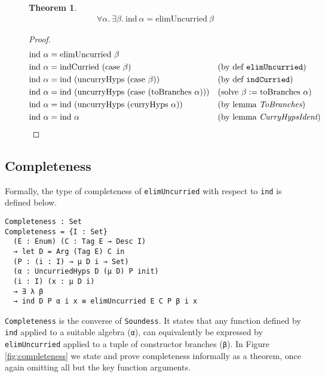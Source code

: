 \documentclass[nonatbib]{sigplanconf}
\newtheorem*{mythm}{Theorem}
\newcommand{\reffig}[1]{Figure \ref{fig:#1}}
\begin{document}
\begin{figure*}
\caption{Completeness of {\tt elim}}
\label{fig:completeness}
\begin{mythm}
\begin{align*}
\forall \alpha. ~ \exists \beta.
~ \textrm{ind} ~ \alpha = \textrm{elimUncurried} ~ \beta
\end{align*}
\end{mythm}

\begin{proof}
\begin{align*}
\textrm{ind} ~ \alpha &= \textrm{elimUncurried} ~ \beta& && \\
\textrm{ind} ~ \alpha &=\textrm{indCurried} ~ ( \textrm{case} ~ \beta ) && \text{(by def {\tt elimUncurried})} \notag\\
\textrm{ind} ~ \alpha &= \textrm{ind} ~ ( \textrm{uncurryHyps} ~ ( \textrm{case} ~ \beta ) ) && \text{(by def {\tt indCurried})} \notag\\
\textrm{ind} ~ \alpha &= \textrm{ind} ~ ( \textrm{uncurryHyps} ~ ( \textrm{case} ~ ( \textrm{toBranches} ~ \alpha ) ) ) && (\text{solve} ~ \beta := \textrm{toBranches} ~ \alpha) \\
\textrm{ind} ~ \alpha &= \textrm{ind} ~ ( \textrm{uncurryHyps} ~ ( \textrm{curryHyps} ~ \alpha ) ) && \text{(by lemma {\it ToBranches})} \\
\textrm{ind} ~ \alpha &= \textrm{ind} ~ \alpha && \text{(by lemma {\it CurryHypsIdent})}
\end{align*}
\end{proof}
\end{figure*}

\subsection{Completeness}

Formally, the type of completeness of {\tt elimUncurried} with respect to
{\tt ind} is defined below.

\begin{verbatim}
Completeness : Set
Completeness = {I : Set} 
  (E : Enum) (C : Tag E → Desc I)
  → let D = Arg (Tag E) C in
  (P : (i : I) → μ D i → Set)
  (α : UncurriedHyps D (μ D) P init)
  (i : I) (x : μ D i)
  → ∃ λ β
  → ind D P α i x ≡ elimUncurried E C P β i x
\end{verbatim}

{\tt Completeness} is the converse of {\tt Soundess}.
It states that any function defined by
{\tt ind} applied to a suitable algebra ({\tt α}), can equivalently be
expressed by {\tt elimUncurried} applied to a tuple of constructor branches
({\tt β}). In \reffig{completeness} we
state and prove completeness informally
as a theorem, once again omitting all but the key function arguments.
\end{document}
